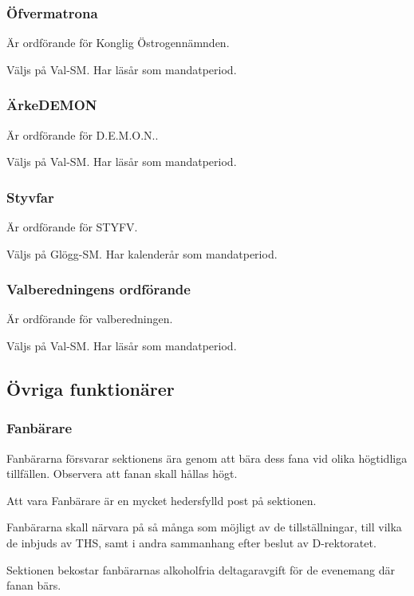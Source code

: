 \documentclass{dgovdoc}
\begin{document}
\subsubsection{Öfvermatrona}

Är ordförande för Konglig Östrogennämnden.

Väljs på Val-SM. Har läsår som mandatperiod.

\subsubsection{ÄrkeDEMON}

Är ordförande för D.E.M.O.N..

Väljs på Val-SM. Har läsår som mandatperiod.

\subsubsection{Styvfar}

Är ordförande för STYFV.

Väljs på Glögg-SM. Har kalenderår som mandatperiod.

\subsubsection{Valberedningens ordförande}

Är ordförande för valberedningen.

Väljs på Val-SM. Har läsår som mandatperiod.

\subsection{Övriga funktionärer}

\subsubsection{Fanbärare}

Fanbärarna försvarar sektionens ära genom att bära dess fana vid olika
högtidliga tillfällen. Observera att fanan skall hållas högt.

Att vara Fanbärare är en mycket hedersfylld post på sektionen.

Fanbärarna skall närvara på så många som möjligt av de tillställningar, till
vilka de inbjuds av THS, samt i andra sammanhang efter beslut av D-rektoratet.

Sektionen bekostar fanbärarnas alkoholfria deltagaravgift för de evenemang där
fanan bärs.
\end{document}
